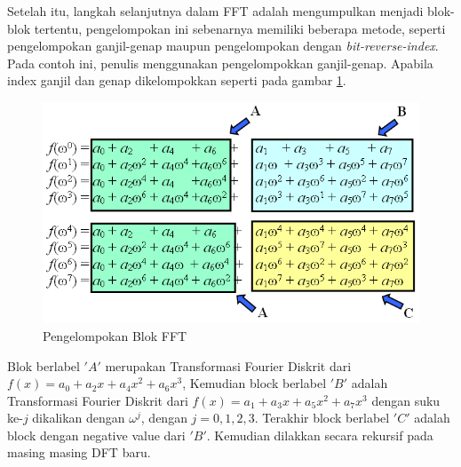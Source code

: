Setelah itu, langkah selanjutnya dalam FFT adalah mengumpulkan menjadi blok-blok tertentu, pengelompokan ini sebenarnya memiliki beberapa metode, seperti pengelompokan ganjil-genap maupun pengelompokan dengan \textit{bit-reverse-index}. Pada contoh ini, penulis menggunakan pengelompokkan ganjil-genap. Apabila index ganjil dan genap dikelompokkan seperti pada gambar \ref{fig:fft_ordering}.
\begin{figure}
	\Centering
	\includegraphics [scale=0.5]{bab2/img/fft_ordering}
	\caption {Pengelompokan Blok FFT}
	\label {fig:fft_ordering}
\end{figure}
Blok berlabel $'A'$ merupakan Transformasi Fourier Diskrit dari $ f(x) = a_0 + a_2x + a_4x^2 + a_6x^3 $, Kemudian block berlabel $'B'$ adalah Transformasi Fourier Diskrit dari $ f(x) = a_1 + a_3x + a_5x^2 + a_7x^3 $ dengan suku ke-$j$ dikalikan dengan $\omega^j$, dengan $j = 0,1,2,3 $. Terakhir block berlabel $'C'$ adalah block dengan negative value dari $'B'$. Kemudian dilakkan secara rekursif pada masing masing DFT baru.

